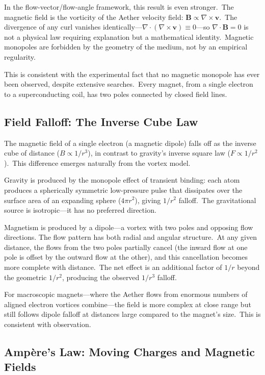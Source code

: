 ﻿\documentclass[12pt,letterpaper]{article}
\begin{document}
In the flow-vector/flow-angle framework, this result is even stronger.\ The magnetic
field is the vorticity of the Aether velocity field: $\mathbf{B} \propto \nabla \times
\mathbf{v}$.\ The divergence of any curl vanishes identically---$\nabla \cdot
(\nabla \times \mathbf{v}) \equiv 0$---so $\nabla \cdot \mathbf{B} = 0$ is not a
physical law requiring explanation but a mathematical identity.\ Magnetic monopoles are
forbidden by the geometry of the medium, not by an empirical regularity.

This is consistent with the experimental fact that no magnetic monopole has ever been
observed, despite extensive searches.\ Every magnet, from a single electron to a
superconducting coil, has two poles connected by closed field lines.


\subsection{Field Falloff: The Inverse Cube Law}

The magnetic field of a single electron (a magnetic dipole) falls off as the inverse cube
of distance ($B \propto 1/r^3$), in contrast to gravity's inverse square law
($F \propto 1/r^2$).\ This difference emerges naturally from the vortex model.

Gravity is produced by the monopole effect of transient binding: each atom produces a
spherically symmetric low-pressure pulse that dissipates over the surface area of an
expanding sphere ($4\pi r^2$), giving $1/r^2$ falloff.\ The gravitational source is isotropic---it has no preferred direction.

Magnetism is produced by a dipole---a vortex with two poles and opposing flow directions.
The flow pattern has both radial and angular structure.\ At any given distance, the flows
from the two poles partially cancel (the inward flow at one pole is offset by the outward
flow at the other), and this cancellation becomes more complete with distance.\ The net
effect is an additional factor of $1/r$ beyond the geometric $1/r^2$, producing the observed
$1/r^3$ falloff.

For macroscopic magnets---where the Aether flows from enormous numbers of aligned electron
vortices combine---the field is more complex at close range but still follows dipole
falloff at distances large compared to the magnet's size.\ This is consistent with
observation.


\subsection{Amp\`ere's Law: Moving Charges and Magnetic Fields}
\end{document}
